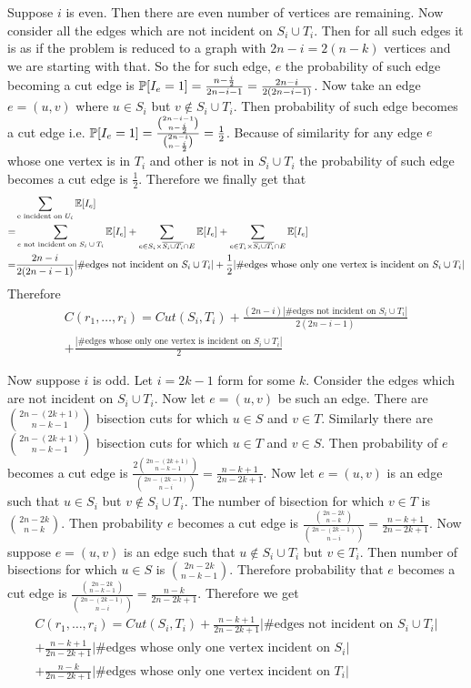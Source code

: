 \documentclass[a4paper, 11pt]{article}
\begin{document}
{Suppose $i$ is even. Then there are even number of vertices are remaining. Now consider all the edges which are not incident on $S_i\cup T_i$. Then for all such edges it is as if the problem is reduced to a graph with $2n-i=2(n-k)$ vertices and we are starting with that. So the for such edge, $e$ the probability of such edge becoming a cut edge is $\mathbb{P}[I_e=1]=\frac{n-\frac{i}{2}}{2n-i-1}=\frac{2n-i}{2(2n-i-1)}$. Now take an edge $e=(u,v)$ where $u\in S_i$ but $v\notin S_i\cup T_i$. Then probability of such edge becomes a cut edge i.e. $\mathbb{P}[I_e=1]=\frac{\binom{2n-i-1}{n-\frac{i}{2}}}{\binom{2n-i}{n-\frac{i}2}}=\frac12$. Because of similarity for any edge $e$ whose one vertex is in $T_i$ and other is not in $S_i\cup T_i$ the probability of such edge becomes a cut edge is $\frac12$. Therefore we finally get that \begin{align*}
	&\sum\limits_{\text{e incident on }U_i}\mathbb{E}[I_e]\\
	=&\sum_{e\text{ not incident on $S_i\cup T_i$}}\mathbb{E}[I_e]+\sum_{e\in S_i\times \overline{S_i\cup T_i}\cap E}\mathbb{E}[I_e]+\sum_{e\in T_i\times \overline{S_i\cup T_i}\cap E}\mathbb{E}[I_e]\\
	= &\frac{2n-i}{2(2n-i-1)}|\#\text{edges not incident on $S_i\cup T_i$}|+\frac12|\#\text{edges whose only one vertex is incident on $S_i\cup T_i$}|
\end{align*}
Therefore \begin{multline*}
	C(r_1,\dots, r_i)=Cut(S_i,T_i)+\frac{(2n-i)|\#\text{edges not incident on $S_i\cup T_i$}|}{2(2n-i-1)}\\
	+\frac{|\#\text{edges whose only one vertex is incident on $S_i\cup T_i$}|}2
\end{multline*}

Now suppose $i$ is odd. Let $i=2k-1$ form for some $k$. Consider the edges which are not incident on $S_i\cup T_i$. Now let $e=(u,v)$ be such an edge. There are $\binom{2n-(2k+1)}{n-k-1}$ bisection cuts for which $u\in S$ and $v\in T$. Similarly there are $\binom{2n-(2k+1)}{n-k-1}$ bisection cuts for which $u\in T$ and $v\in S$. Then probability of $e$ becomes a cut edge is $\frac{2\binom{2n-(2k+1)}{n-k-1}}{\binom{2n-(2k-1)}{n-i}}=\frac{n-k+1}{2n-2k+1}$. Now let $e=(u,v)$ is an edge such that $u\in S_i $ but $v\notin S_i\cup T_i$. The number of bisection for which $v\in T$ is  $\binom{2n-2k}{n-k}$. Then probability $e$ becomes a cut edge is $\frac{\binom{2n-2k}{n-k}}{\binom{2n-(2k-1)}{n-i}}=\frac{n-k+1}{2n-2k+1}$. Now suppose $e=(u,v)$ is an edge such that $u\notin S_i\cup T_i$ but $v\in T_i$. Then number of bisections for which $u\in S$ is $\binom{2n-2k}{n-k-1}$. Therefore probability that $e$ becomes a cut edge is $\frac{\binom{2n-2k}{n-k-1}}{\binom{2n-(2k-1)}{n-i}}=\frac{n-k}{2n-2k+1}$. Therefore we get 
\begin{multline*}
	C(r_1,\dots, r_i)=Cut(S_i,T_i)+\frac{n-k+1}{2n-2k+1}|\#\text{edges not incident on $S_i\cup T_i$}|\\
	+\frac{n-k+1}{2n-2k+1}|\#\text{edges whose only one vertex incident on $S_i$}|\\
	+\frac{n-k}{2n-2k+1}|\#\text{edges whose only one vertex incident on $T_i$}|
\end{multline*}

}
\end{document}
